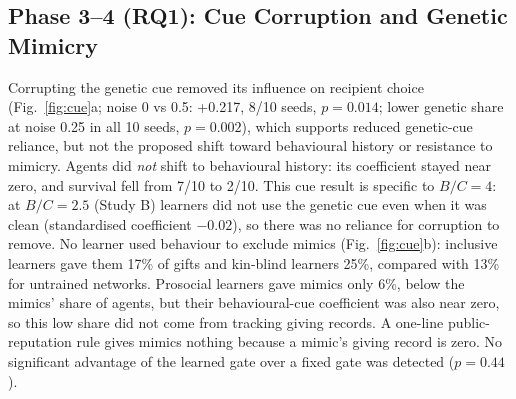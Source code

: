 \documentclass{article}
\begin{document}
\begin{table}[!htbp]
\centering
\caption{Study C: reward controls at $B/C=4$ (10 seeds; mean [95\% CI]). Intervals are unconstrained Student-$t$ intervals over seeds, so a bound can pass a metric's range (e.g.\ 1.001 for a donation rate near its maximum of 1).}
\label{tab:controls}
\small
{}
\end{table}

\subsection{Phase 3--4 (RQ1): Cue Corruption and Genetic Mimicry}
Corrupting the genetic cue removed its influence on recipient choice (Fig.~\ref{fig:cue}a; noise 0 vs 0.5: +0.217, 8/10 seeds, $p=0.014$; lower genetic share at noise 0.25 in all 10 seeds, $p=0.002$), which supports reduced genetic-cue reliance, but not the proposed shift toward behavioural history or resistance to mimicry. Agents did \emph{not} shift to behavioural history: its coefficient stayed near zero, and survival fell from 7/10 to 2/10. This cue result is specific to $B/C=4$: at $B/C=2.5$ (Study B) learners did not use the genetic cue even when it was clean (standardised coefficient $-0.02$), so there was no reliance for corruption to remove. No learner used behaviour to exclude mimics (Fig.~\ref{fig:cue}b): inclusive learners gave them 17\% of gifts and kin-blind learners 25\%, compared with 13\% for untrained networks. Prosocial learners gave mimics only 6\%, below the mimics' share of agents, but their behavioural-cue coefficient was also near zero, so this low share did not come from tracking giving records. A one-line public-reputation rule gives mimics nothing because a mimic's giving record is zero. No significant advantage of the learned gate over a fixed gate was detected ($p=0.44$).
\end{document}
